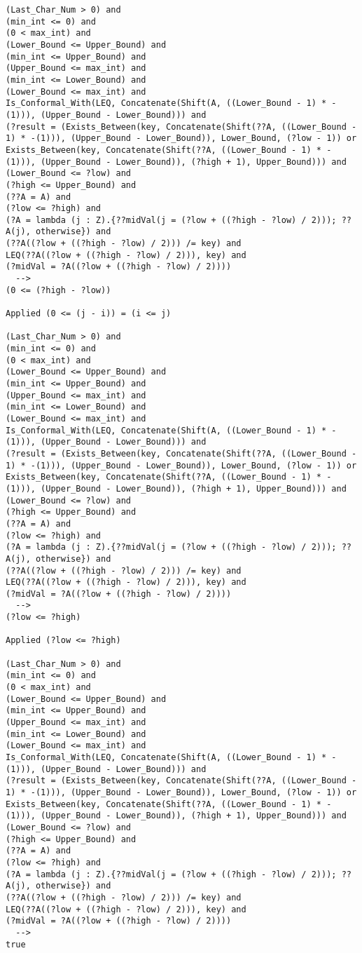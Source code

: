 \begin{lstlisting}[language=resolve]
(Last_Char_Num > 0) and
(min_int <= 0) and
(0 < max_int) and
(Lower_Bound <= Upper_Bound) and
(min_int <= Upper_Bound) and
(Upper_Bound <= max_int) and
(min_int <= Lower_Bound) and
(Lower_Bound <= max_int) and
Is_Conformal_With(LEQ, Concatenate(Shift(A, ((Lower_Bound - 1) * -(1))), (Upper_Bound - Lower_Bound))) and
(?result = (Exists_Between(key, Concatenate(Shift(??A, ((Lower_Bound - 1) * -(1))), (Upper_Bound - Lower_Bound)), Lower_Bound, (?low - 1)) or Exists_Between(key, Concatenate(Shift(??A, ((Lower_Bound - 1) * -(1))), (Upper_Bound - Lower_Bound)), (?high + 1), Upper_Bound))) and
(Lower_Bound <= ?low) and
(?high <= Upper_Bound) and
(??A = A) and
(?low <= ?high) and
(?A = lambda (j : Z).{??midVal(j = (?low + ((?high - ?low) / 2))); ??A(j), otherwise}) and
(??A((?low + ((?high - ?low) / 2))) /= key) and
LEQ(??A((?low + ((?high - ?low) / 2))), key) and
(?midVal = ?A((?low + ((?high - ?low) / 2))))
  -->
(0 <= (?high - ?low))

Applied (0 <= (j - i)) = (i <= j)

(Last_Char_Num > 0) and
(min_int <= 0) and
(0 < max_int) and
(Lower_Bound <= Upper_Bound) and
(min_int <= Upper_Bound) and
(Upper_Bound <= max_int) and
(min_int <= Lower_Bound) and
(Lower_Bound <= max_int) and
Is_Conformal_With(LEQ, Concatenate(Shift(A, ((Lower_Bound - 1) * -(1))), (Upper_Bound - Lower_Bound))) and
(?result = (Exists_Between(key, Concatenate(Shift(??A, ((Lower_Bound - 1) * -(1))), (Upper_Bound - Lower_Bound)), Lower_Bound, (?low - 1)) or Exists_Between(key, Concatenate(Shift(??A, ((Lower_Bound - 1) * -(1))), (Upper_Bound - Lower_Bound)), (?high + 1), Upper_Bound))) and
(Lower_Bound <= ?low) and
(?high <= Upper_Bound) and
(??A = A) and
(?low <= ?high) and
(?A = lambda (j : Z).{??midVal(j = (?low + ((?high - ?low) / 2))); ??A(j), otherwise}) and
(??A((?low + ((?high - ?low) / 2))) /= key) and
LEQ(??A((?low + ((?high - ?low) / 2))), key) and
(?midVal = ?A((?low + ((?high - ?low) / 2))))
  -->
(?low <= ?high)

Applied (?low <= ?high)

(Last_Char_Num > 0) and
(min_int <= 0) and
(0 < max_int) and
(Lower_Bound <= Upper_Bound) and
(min_int <= Upper_Bound) and
(Upper_Bound <= max_int) and
(min_int <= Lower_Bound) and
(Lower_Bound <= max_int) and
Is_Conformal_With(LEQ, Concatenate(Shift(A, ((Lower_Bound - 1) * -(1))), (Upper_Bound - Lower_Bound))) and
(?result = (Exists_Between(key, Concatenate(Shift(??A, ((Lower_Bound - 1) * -(1))), (Upper_Bound - Lower_Bound)), Lower_Bound, (?low - 1)) or Exists_Between(key, Concatenate(Shift(??A, ((Lower_Bound - 1) * -(1))), (Upper_Bound - Lower_Bound)), (?high + 1), Upper_Bound))) and
(Lower_Bound <= ?low) and
(?high <= Upper_Bound) and
(??A = A) and
(?low <= ?high) and
(?A = lambda (j : Z).{??midVal(j = (?low + ((?high - ?low) / 2))); ??A(j), otherwise}) and
(??A((?low + ((?high - ?low) / 2))) /= key) and
LEQ(??A((?low + ((?high - ?low) / 2))), key) and
(?midVal = ?A((?low + ((?high - ?low) / 2))))
  -->
true


\end{lstlisting}
